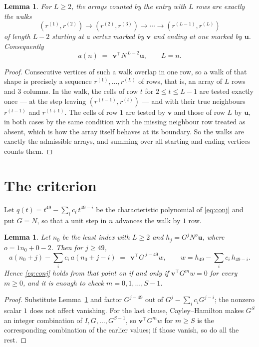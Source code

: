 \documentclass[11pt,a4paper]{article}
\theoremstyle{plain}
\newtheorem{lemma}[theorem]{Lemma}
\theoremstyle{definition}
\begin{document}
\begin{lemma}\label{lem:walk}
For $L\ge2$, the arrays counted by the entry with $L$ rows are exactly the walks
\[
(r^{(1)},r^{(2)})\to(r^{(2)},r^{(3)})\to\cdots\to(r^{(L-1)},r^{(L)})
\]
of length $L-2$ starting at a vertex marked by $\mathbf{v}$ and ending at one marked by
$\mathbf{u}$. Consequently
\[
a(n)\;=\;\,\mathbf{v}^{\!\top}N^{\,L-2}\mathbf{u},\qquad L=n .
\]
\end{lemma}

\begin{proof}
Consecutive vertices of such a walk overlap in one row, so a walk of that shape is
precisely a sequence $r^{(1)},\dots,r^{(L)}$ of rows, that is, an array of $L$ rows
and $3$ columns. In the walk, the cells of row $t$ for $2\le t\le L-1$ are tested
exactly once --- at the step leaving $(r^{(t-1)},r^{(t)})$ --- and with their true
neighbours $r^{(t-1)}$ and $r^{(t+1)}$. The cells of row $1$ are tested by
$\mathbf{v}$ and those of row $L$ by $\mathbf{u}$, in both cases by the same condition
with the missing neighbour row treated as absent, which is how the array itself behaves at
its boundary. So the walks are exactly the admissible arrays, and summing over all starting
and ending vertices counts them.
\end{proof}

\section{The criterion}

Let $q(t)=t^{49}-\sum_i c_i\,t^{49-i}$ be the characteristic polynomial of
\eqref{eq:conj} and put $G=N$, so that a unit step in $n$ advances the walk by
$1$ row.

\begin{lemma}\label{lem:crit}
Let $n_0$ be the least index with $L\ge2$ and $h_j=G^{j}N^{o}\mathbf{u}$, where
$o=1n_0+0-2$. Then for $j\ge49$,
\[
a(n_0+j)-\sum_i c_i\,a(n_0+j-i)\;=\;\,\mathbf{v}^{\!\top}G^{\,j-49}w,
\qquad w=h_{49}-\sum_i c_i\,h_{49-i} .
\]
Hence \eqref{eq:conj} holds from that point on if and only if
$\mathbf{v}^{\!\top}G^{m}w=0$ for every $m\ge0$, and it is enough to check
$m=0,1,\dots,S-1$.
\end{lemma}

\begin{proof}
Substitute Lemma~\ref{lem:walk} and factor $G^{j-49}$ out of
$G^{j}-\sum_ic_iG^{j-i}$; the nonzero scalar $1$ does not affect
vanishing. For the last clause, Cayley--Hamilton makes $G^{S}$ an integer combination of
$I,G,\dots,G^{S-1}$, so $\mathbf{v}^{\!\top}G^{m}w$ for $m\ge S$ is the corresponding
combination of the earlier values; if those vanish, so do all the rest.
\end{proof}
\end{document}

